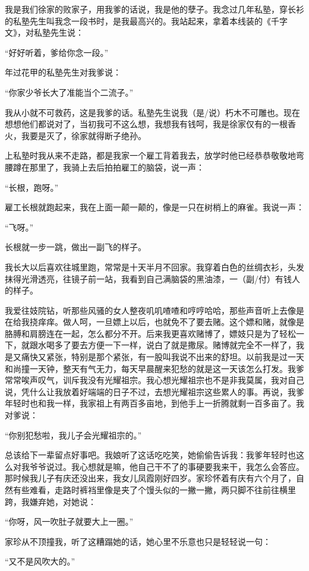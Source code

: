 \documentclass[12pt,UTF8]{ctexbook}
\begin{document}
我是我们徐家的败家子，用我爹的话说，我是他的孽子。我念过几年私塾，穿长衫的私塾先生叫我念一段书时，是我最高兴的。我站起来，拿着本线装的《千字文》，对私塾先生说：

“好好听着，爹给你念一段。”

年过花甲的私塾先生对我爹说：

“你家少爷长大了准能当个二流子。”

我从小就不可救药，这是我爹的话。私塾先生说我（是/说）朽木不可雕也。现在想想他们都说对了，当初我可不这么想，我想我有钱呵，我是徐家仅有的一根香火，我要是灭了，徐家就得断子绝孙。

上私塾时我从来不走路，都是我家一个雇工背着我去，放学时他已经恭恭敬敬地弯腰蹲在那里了，我骑上去后拍拍雇工的脑袋，说一声：

“长根，跑呀。”

雇工长根就跑起来，我在上面一颠一颠的，像是一只在树梢上的麻雀。我说一声：

“飞呀。”

长根就一步一跳，做出一副飞的样子。

我长大以后喜欢往城里跑，常常是十天半月不回家。我穿着白色的丝绸衣衫，头发抹得光滑透亮，往镜子前一站，我看到自己满脑袋的黑油漆，一（副/付）有钱人的样子。

我爱往妓院钻，听那些风骚的女人整夜叽叽喳喳和哼哼哈哈，那些声音听上去像是在给我挠痒痒。做人呵，一旦嫖上以后，也就免不了要去赌。这个嫖和赌，就像是胳膊和肩膀连在一起，怎么都分不开。后来我更喜欢赌博了，嫖妓只是为了轻松一下，就跟水喝多了要去方便一下一样，说白了就是撒尿。赌博就完全不一样了，我是又痛快又紧张，特别是那个紧张，有一股叫我说不出来的舒坦。以前我是过一天和尚撞一天钟，整天有气无力，每天早晨醒来犯愁的就是这一天该怎么打发。我爹常常唉声叹气，训斥我没有光耀祖宗。我心想光耀祖宗也不是非我莫属，我对自己说，凭什么让我放着好端端的日子不过，去想光耀祖宗这些累人的事。再说，我爹年轻时也和我一样，我家祖上有两百多亩地，到他手上一折腾就剩一百多亩了。我对爹说：

“你别犯愁啦，我儿子会光耀祖宗的。”

总该给下一辈留点好事吧。我娘听了这话吃吃笑，她偷偷告诉我：我爹年轻时也这么对我爷爷说过。我心想就是嘛，他自己干不了的事硬要我来干，我怎么会答应。那时候我儿子有庆还没出来，我女儿凤霞刚好四岁。家珍怀着有庆有六个月了，自然有些难看，走路时裤裆里像是夹了个馒头似的一撇一撇，两只脚不往前往横里跨，我嫌弃她，对她说：

“你呀，风一吹肚子就要大上一圈。”

家珍从不顶撞我，听了这糟蹋她的话，她心里不乐意也只是轻轻说一句：

“又不是风吹大的。”
\end{document}
